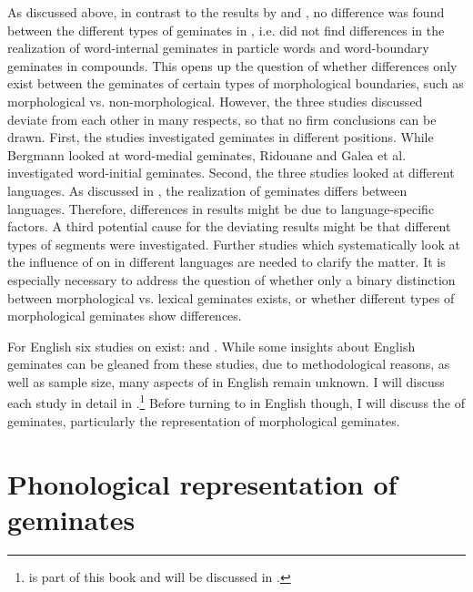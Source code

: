 As discussed above, in contrast to the results by \cite{Ridouane.2010} and \cite{Galea.2014}, no difference was found between the different types of geminates in \cite{Bergmann.2017}, i.e. \cite{Bergmann.2017} did not find differences in the realization of word-internal geminates in particle words and word-boundary geminates in compounds. This opens up the question of whether differences only exist between the geminates of certain types of morphological boundaries, such as morphological vs. non-morphological. However, the three studies discussed deviate from each other in many respects, so that no firm conclusions can be drawn. First, the studies investigated geminates in different positions. While Bergmann looked at word-medial geminates, Ridouane and Galea et al. investigated word-initial geminates. Second, the three studies looked at different languages. As discussed in , the realization of geminates differs between languages. Therefore, differences in results might be due to language-specific factors. A third potential cause for the deviating results might be that different types of segments were investigated. Further studies which systematically look at the influence of  on  in different languages are needed to clarify the matter. It is especially necessary to address the question of whether only a binary distinction between morphological vs.  lexical geminates exists, or whether different types of  morphological geminates show differences.


For English six studies on  exist: \cite{Delattre.,Kaye.2005,Oh.2012,Oh.2013,Kotzor.2016} and \cite{BenHedia.2017}. While some insights about English geminates can be gleaned from these studies, due to methodological reasons, as well as sample size, many aspects of  in English remain unknown. I will discuss each study in detail in .\footnote{\cite{BenHedia.2017} is part of this book and will be discussed in .} Before turning to  in English though, I will discuss the  of geminates, particularly the representation of  morphological geminates.



\section{Phonological representation of geminates } \label{Phonological representation of geminates}


